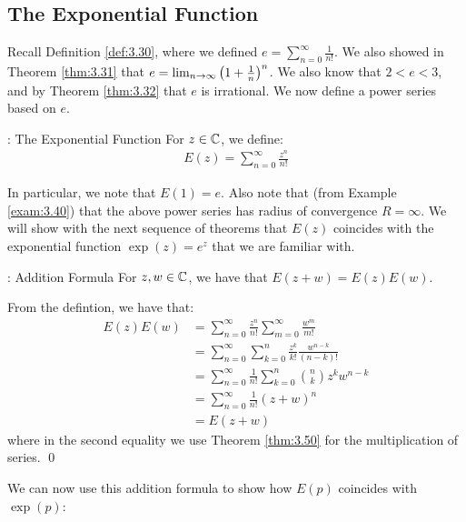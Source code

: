\subsection{The Exponential Function}
Recall Definition \ref{def:3.30}, where we defined $e = \sum_{n=0}^\infty \frac{1}{n!}$. We also showed in Theorem \ref{thm:3.31} that $e = \lim_{n \rightarrow \infty}\left(1 + \frac{1}{n}\right)^n$. We also know that $2 < e < 3$, and  by Theorem \ref{thm:3.32} that $e$ is irrational. We now define a power series based on $e$. 

\begin{ndef}{: The Exponential Function}{}
    For $z \in \mathbb{C}$, we define:
    \begin{align*}
        E(z) = \sum_{n=0}^\infty \frac{z^n}{n!}
    \end{align*}
\end{ndef}
\noindent In particular, we note that $E(1) = e$. Also note that (from Example \ref{exam:3.40}) that the above power series has radius of convergence $R = \infty$. We will show with the next sequence of theorems that $E(z)$ coincides with the exponential function $\exp(z) = e^z$ that we are familiar with.

\begin{ntheorem}{: Addition Formula}{}
    For $z, w \in \mathbb{C}$, we have that $E(z + w) = E(z)E(w)$.
\end{ntheorem}
\begin{nproof}
    From the defintion, we have that:
    \begin{align*}
        E(z)E(w) &= \sum_{n=0}^\infty \frac{z^n}{n!}\sum_{m=0}^\infty\frac{w^m}{m!}
        \\ &= \sum_{n=0}^\infty \sum_{k=0}^n \frac{z^k}{k!}\frac{w^{n-k}}{(n-k)!}
        \\ &= \sum_{n=0}^\infty \frac{1}{n!}\sum_{k=0}^n\binom{n}{k}z^kw^{n-k}
        \\ &= \sum_{n=0}^\infty \frac{1}{n!}(z + w)^n
        \\ &= E(z + w)
    \end{align*}
    where in the second equality we use Theorem \ref{thm:3.50} for the multiplication of series. \qed
\end{nproof}
\noindent We can now use this addition formula to show how $E(p)$ coincides with $\exp(p)$:

